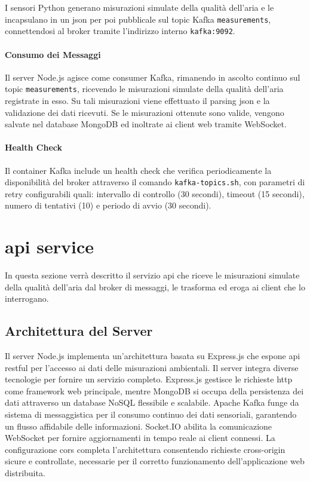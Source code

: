I sensori Python generano misurazioni simulate della qualità dell'aria e le incapsulano
in un \acrshort{json} per poi pubblicale sul topic Kafka \texttt{measurements}, connettendosi
al broker tramite l'indirizzo interno \texttt{kafka:9092}.

\paragraph{Consumo dei Messaggi}

Il server Node.js agisce come consumer Kafka, rimanendo in ascolto continuo sul topic \texttt{measurements},
ricevendo le misurazioni simulate della qualità dell'aria registrate in esso. Su tali misurazioni viene effettuato
il parsing \acrshort{json} e la validazione dei dati ricevuti. Se le misurazioni ottenute sono valide,
vengono salvate nel database MongoDB ed inoltrate ai client web tramite WebSocket.

\paragraph{Health Check}

Il container Kafka include un health check che verifica periodicamente la disponibilità del broker
attraverso il comando \texttt{kafka-topics.sh}, con parametri di retry configurabili quali:
intervallo di controllo (30 secondi), timeout (15 secondi), numero di tentativi (10) e periodo di avvio (30 secondi).

\section{\acrshort{api} service}

In questa sezione verrà descritto il servizio \acrshort{api} che riceve le misurazioni simulate della qualità dell'aria
dal broker di messaggi, le trasforma ed eroga ai client che lo interrogano.

\subsection{Architettura del Server}

Il server Node.js implementa un'architettura basata su Express.js che espone \acrshort{api} \acrshort{rest}ful
per l'accesso ai dati delle misurazioni ambientali.
Il server integra diverse tecnologie per fornire un servizio completo.
Express.js gestisce le richieste \acrshort{http} come framework web principale,
mentre MongoDB si occupa della persistenza dei dati attraverso un database NoSQL flessibile e scalabile.
Apache Kafka funge da sistema di messaggistica per il consumo continuo dei dati sensoriali,
garantendo un flusso affidabile delle informazioni.
Socket.IO abilita la comunicazione WebSocket per fornire aggiornamenti in tempo reale ai client connessi.
La configurazione \acrshort{cors} completa l'architettura consentendo richieste cross-origin sicure e controllate,
necessarie per il corretto funzionamento dell'applicazione web distribuita.

